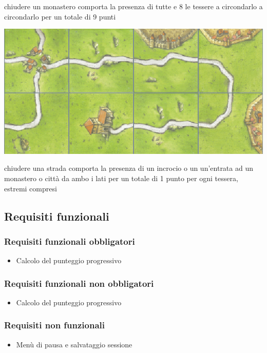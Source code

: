 \vfill

chiudere un monastero comporta la presenza di tutte e 8 le tessere a circondarlo a circondarlo per un totale di 9 punti

\vfill

        {\includegraphics[scale=.42]{images/Strada.png}}

\vfill

chiudere una strada comporta la presenza di un incrocio o un un’entrata ad un monastero o città da ambo i lati per un totale di 1 punto per ogni tessera, estremi compresi

\subsection*{Requisiti funzionali}
\subsubsection*{Requisiti funzionali obbligatori}
\begin{itemize}
\item Calcolo del punteggio progressivo
\end{itemize}
\subsubsection*{Requisiti funzionali non obbligatori}
\begin{itemize}
\item Calcolo del punteggio progressivo
\end{itemize}

\subsubsection*{Requisiti non funzionali}
\begin{itemize}
\item Menù di pausa e salvataggio sessione
\end{itemize}

